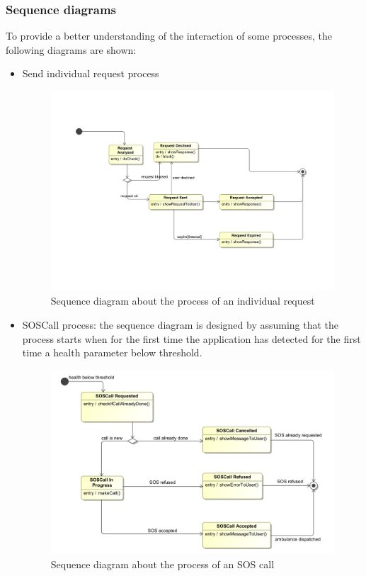 \subsubsection{Sequence diagrams}
To provide a better understanding of the interaction of some processes, the following diagrams are shown:
\begin{itemize}
\item Send individual request process
\begin{figure}[H]
\includegraphics[width=\linewidth]{Images/requestdiagram}
\caption{Sequence diagram about the process of an individual request }
\label{fig:sequencediagram1}
\end{figure}

\item SOSCall process: the sequence diagram is designed by assuming that the process starts when for the first time the application has detected for the first time a health parameter below threshold.
\begin{figure}[H]
\includegraphics[width=\linewidth]{Images/sosdiagram}
\caption{Sequence diagram about the process of an SOS call }
\label{fig:sequencediagram2}
\end{figure}

\end{itemize}